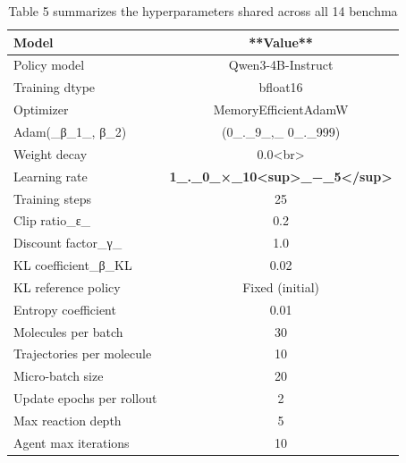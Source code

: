 \begin{table}[t]
\centering
\caption{Table 5 summarizes the hyperparameters shared across all 14 benchma}
\label{tab:2604.07669}
\begin{tabular}{lc}
\toprule
Model & **Value** \\
\midrule
Policy model & Qwen3-4B-Instruct \\
Training dtype & bfloat16 \\
Optimizer & MemoryEfficientAdamW \\
Adam(_β_1_, β_2) & (0_._9_,_ 0_._999) \\
Weight decay & 0.0<br> \\
Learning rate & \textbf{1_._0_×_10<sup>_−_5</sup>} \\
Training steps & 25 \\
Clip ratio_ε_ & 0.2 \\
Discount factor_γ_ & 1.0 \\
KL coefficient_β_KL & 0.02 \\
KL reference policy & Fixed (initial) \\
Entropy coefficient & 0.01 \\
Molecules per batch & 30 \\
Trajectories per molecule & 10 \\
Micro-batch size & 20 \\
Update epochs per rollout & 2 \\
Max reaction depth & 5 \\
Agent max iterations & 10 \\
\bottomrule
\end{tabular}
\end{table}
